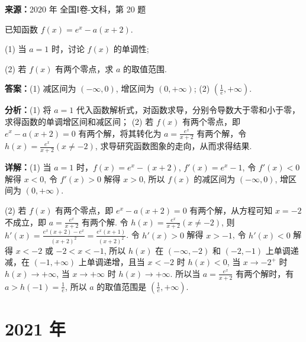 \begin{question}[points=12]
\textbf{来源：}2020 年 全国I卷-文科，第 20 题\par
已知函数 $f(x) = e^x - a(x+2)$.



(1) 当 $a=1$ 时，讨论 $f(x)$ 的单调性;



(2) 若 $f(x)$ 有两个零点，求 $a$ 的取值范围.
\begin{solution}
\textbf{答案：}(1) 减区间为 $(-\infty, 0)$, 增区间为 $(0, +\infty)$; (2) $\left(\frac{1}{e}, +\infty\right)$.

\textbf{分析：}(1) 将 $a=1$ 代入函数解析式，对函数求导，分别令导数大于零和小于零，求得函数的单调增区间和减区间； (2) 若 $f(x)$ 有两个零点，即 $e^x - a(x+2)=0$ 有两个解，将其转化为 $a = \frac{e^x}{x+2}$ 有两个解，令 $h(x)=\frac{e^x}{x+2} (x\neq -2)$, 求导研究函数图象的走向，从而求得结果.

\textbf{详解：}(1) 当 $a=1$ 时，$f(x)=e^x-(x+2)$, $f'(x)=e^x-1$, 令 $f'(x)<0$ 解得 $x<0$, 令 $f'(x)>0$ 解得 $x>0$, 所以 $f(x)$ 的减区间为 $(-\infty,0)$, 增区间为 $(0,+\infty)$.

(2) 若 $f(x)$ 有两个零点，即 $e^x - a(x+2)=0$ 有两个解，从方程可知 $x=-2$ 不成立，即 $a = \frac{e^x}{x+2}$ 有两个解. 令 $h(x)=\frac{e^x}{x+2} (x\neq -2)$, 则 $h'(x)=\frac{e^x(x+2)-e^x}{(x+2)^2}=\frac{e^x(x+1)}{(x+2)^2}$. 令 $h'(x)>0$ 解得 $x>-1$, 令 $h'(x)<0$ 解得 $x<-2$ 或 $-2<x<-1$, 所以 $h(x)$ 在 $(-\infty,-2)$ 和 $(-2,-1)$ 上单调递减，在 $(-1,+\infty)$ 上单调递增，且当 $x<-2$ 时 $h(x)<0$, 当 $x\to -2^+$ 时 $h(x)\to +\infty$, 当 $x\to +\infty$ 时 $h(x)\to +\infty$. 所以当 $a = \frac{e^x}{x+2}$ 有两个解时，有 $a > h(-1) = \frac{1}{e}$, 所以 $a$ 的取值范围是 $\left(\frac{1}{e}, +\infty\right)$.
\end{solution}
\end{question}

\section*{2021 年}

